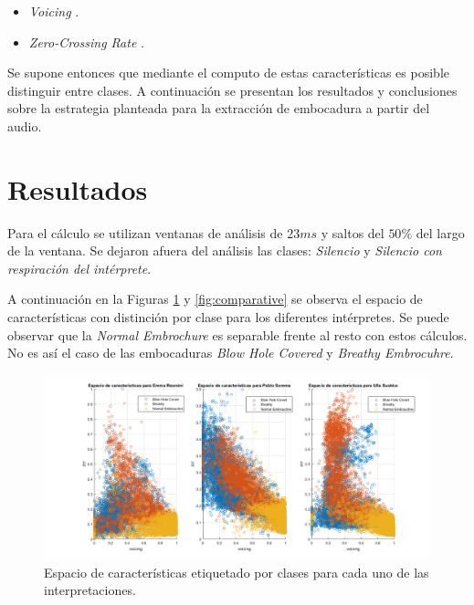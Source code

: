\documentclass{article}
\begin{document}
\begin{itemize} 
  \item \textit{Voicing} \cite[Chapter~12]{klapuri2007signal}.
  \item \textit{Zero-Crossing Rate} \cite[Chapter~4]{rabiner1978digital}. 
\end{itemize}
\medskip

Se supone entonces que mediante el computo de estas características es posible distinguir entre clases. A continuación se presentan los resultados y conclusiones sobre la estrategia planteada para la extracción de embocadura a partir del audio.

\newpage

\section*{Resultados}
Para el cálculo se utilizan ventanas de análisis de $23ms$ y saltos del $50\%$ del largo de la ventana. Se dejaron afuera del análisis las clases: \textit{Silencio} y \textit{Silencio con respiración del intérprete}.
\medskip

A continuación en la Figuras \ref{fig:histogramas_artista} y \ref{fig:comparative} se observa el espacio de características con distinción por clase para los diferentes intérpretes. Se puede observar que la \textit{Normal Embrochure} es separable frente al resto con estos cálculos. No es así el caso de las embocaduras \textit{Blow Hole Covered} y \textit{Breathy Embrocuhre}.

\begin{figure}[H]
\begin{center}
\includegraphics[width=1\textwidth]{histograms_artist} 
\caption{Espacio de características etiquetado por clases para cada uno de las interpretaciones.}
\label{fig:histogramas_artista}
\end{center}
\end{figure}
\end{document}
